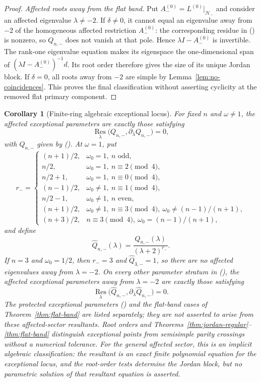\documentclass[twoside,10pt]{article}
\numberwithin{equation}{section}
\theoremstyle{slbody}
\newtheorem{corollary}[theorem]{Corollary}
\theoremstyle{definition}
\theoremstyle{remark}
\newcommand{\Res}{\operatorname*{Res}}
\renewcommand{\eqref}[1]{%
  \textup{{\normalfont(\oldstylenums{\ref{#1}}}\normalfont)}}
\begin{document}
\begin{proof}
\smallskip
\noindent\emph{Affected roots away from the flat band.}
Put
$A_-^{(0)}=L^{(0)}|_{\mathcal H_-}$ and consider an affected eigenvalue
$\lambda\ne-2$.
If $\delta\ne0$, it cannot equal an eigenvalue away from $-2$ of the
homogeneous affected restriction $A_-^{(0)}$: the corresponding residue in
\eqref{eq:Gfinite} is nonzero, so
$Q_{n,-}$ does not vanish at that pole.  Hence
$\lambda I-A_-^{(0)}$ is invertible.  The rank-one eigenvalue equation
makes its eigenspace the one-dimensional span of
$(\lambda I-A_-^{(0)})^{-1}d$.  Its root order therefore gives the size
of its unique Jordan block.  If $\delta=0$, all roots away from $-2$ are
simple by Lemma~\ref{lem:no-coincidences}.  This proves the final classification
without asserting cyclicity at the removed flat primary component.
\end{proof}

\begin{corollary}[Finite-ring algebraic exceptional locus]\label{cor:resultant}
For fixed $n$ and $\omega\ne1$, the affected exceptional
parameters are exactly those satisfying
\[
 \Res_\lambda\bigl(Q_{n,-},\partial_\lambda Q_{n,-}\bigr)=0,
\]
with $Q_{n,-}$ given by \eqref{eq:Qminus-poly}.  At $\omega=1$, put
\begin{equation}\label{eq:flat-affected-order}
r_-=\begin{cases}
 (n+1)/2,&\omega_0=1,\ n\text{ odd},\\
 n/2,&\omega_0=1,\ n\equiv2\pmod4,\\
 n/2+1,&\omega_0=1,\ n\equiv0\pmod4,\\
 (n-1)/2,&\omega_0\ne1,\ n\equiv1\pmod4,\\
 n/2-1,&\omega_0\ne1,\ n\text{ even},\\
 (n+1)/2,&\omega_0\ne1,\ n\equiv3\pmod4,
       \ \omega_0\ne(n-1)/(n+1),\\
 (n+3)/2,&n\equiv3\pmod4,\ \omega_0=(n-1)/(n+1),
\end{cases}
\end{equation}
and define
\[
 \widehat Q_{n,-}(\lambda)
   =\frac{Q_{n,-}(\lambda)}{(\lambda+2)^{r_-}}.
\]
If $n=3$ and $\omega_0=1/2$, then $r_-=3$ and
$\widehat Q_{3,-}=1$, so there are no affected eigenvalues away from
$\lambda=-2$.
On every other parameter stratum in \eqref{eq:flat-affected-order}, the
affected exceptional parameters away from $\lambda=-2$ are exactly those
satisfying
\[
 \Res_\lambda\bigl(\widehat Q_{n,-},
                  \partial_\lambda\widehat Q_{n,-}\bigr)=0.
\]
The protected exceptional parameters \eqref{eq:protected-ep} and the
flat-band cases of Theorem~\ref{thm:flat-band} are listed separately;
they are not asserted to arise from these affected-sector resultants.
Root orders and Theorems~\ref{thm:jordan-regular}--\ref{thm:flat-band}
distinguish exceptional
points from semisimple parity crossings without a numerical tolerance.
For the general affected sector, this is an implicit algebraic
classification: the resultant is an exact finite polynomial equation
for the exceptional locus, and the root-order tests determine the
Jordan block, but no parametric solution of that resultant equation is
asserted.
\end{corollary}
\end{document}
